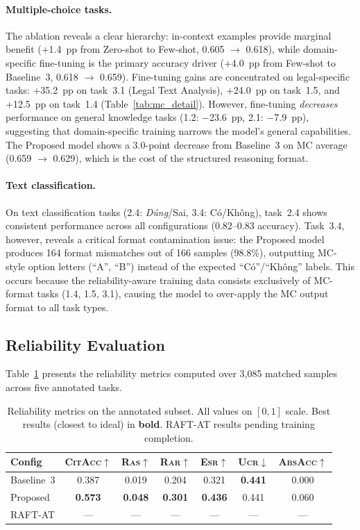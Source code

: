 \documentclass[11pt,a4paper]{article}
\newcommand{\citacc}{\textsc{CitAcc}}
\newcommand{\ras}{\textsc{Ras}}
\newcommand{\rar}{\textsc{Rar}}
\newcommand{\esr}{\textsc{Esr}}
\newcommand{\ucr}{\textsc{Ucr}}
\newcommand{\absacc}{\textsc{AbsAcc}}
\begin{document}
\paragraph{Multiple-choice tasks.}
The ablation reveals a clear hierarchy: in-context examples provide marginal benefit (+1.4~pp from Zero-shot to Few-shot, 0.605 $\rightarrow$ 0.618), while domain-specific fine-tuning is the primary accuracy driver (+4.0~pp from Few-shot to Baseline~3, 0.618 $\rightarrow$ 0.659).
Fine-tuning gains are concentrated on legal-specific tasks: +35.2~pp on task~3.1 (Legal Text Analysis), +24.0~pp on task~1.5, and +12.5~pp on task~1.4 (Table~\ref{tab:mc_detail}).
However, fine-tuning \emph{decreases} performance on general knowledge tasks (1.2: $-$23.6~pp, 2.1: $-$7.9~pp), suggesting that domain-specific training narrows the model's general capabilities.
The Proposed model shows a 3.0-point decrease from Baseline~3 on MC average (0.659 $\rightarrow$ 0.629), which is the cost of the structured reasoning format.

\paragraph{Text classification.}
On text classification tasks (2.4: \emph{D\'ung}/Sai, 3.4: C\'o/Kh\^ong), task~2.4 shows consistent performance across all configurations (0.82--0.83 accuracy).
Task~3.4, however, reveals a critical format contamination issue: the Proposed model produces 164 format mismatches out of 166 samples (98.8\%), outputting MC-style option letters (``A'', ``B'') instead of the expected ``C\'o''/``Kh\^ong'' labels.
This occurs because the reliability-aware training data consists exclusively of MC-format tasks (1.4, 1.5, 3.1), causing the model to over-apply the MC output format to all task types.

\subsection{Reliability Evaluation}

Table~\ref{tab:reliability_results} presents the reliability metrics computed over 3{,}085 matched samples across five annotated tasks.

\begin{table}[htbp]
\centering
\caption{Reliability metrics on the annotated subset. All values on $[0, 1]$ scale. Best results (closest to ideal) in \textbf{bold}. RAFT-AT results pending training completion.}
\label{tab:reliability_results}
\begin{tabular}{@{}lcccccc@{}}
\toprule
\textbf{Config} & \textbf{\citacc}$\uparrow$ & \textbf{\ras}$\uparrow$ & \textbf{\rar}$\uparrow$ & \textbf{\esr}$\uparrow$ & \textbf{\ucr}$\downarrow$ & \textbf{\absacc}$\uparrow$ \\
\midrule
Baseline~3   & 0.387 & 0.019 & 0.204 & 0.321 & \textbf{0.441} & 0.000 \\
Proposed     & \textbf{0.573} & \textbf{0.048} & \textbf{0.301} & \textbf{0.436} & 0.441 & 0.060 \\
RAFT-AT      & --- & --- & --- & --- & --- & --- \\
\bottomrule
\end{tabular}
\end{table}
\end{document}
